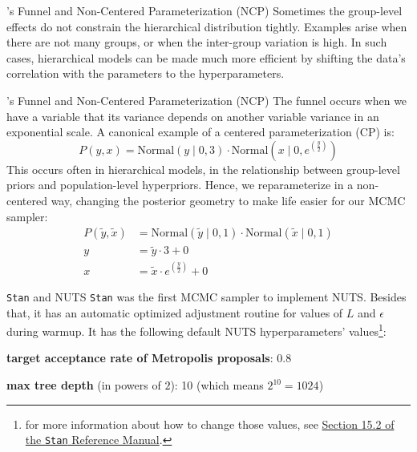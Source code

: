 \begin{frame}{\textcite{nealSliceSampling2003}'s Funnel and Non-Centered Parameterization (NCP)}
	Sometimes the group-level effects do not constrain the hierarchical distribution tightly.
	\vfill
	Examples arise when there are not many groups,
	or when the inter-group variation is high.
	\vfill
	In such cases, hierarchical models can be made much more efficient by shifting the
	data's correlation with the parameters to the hyperparameters.
\end{frame}

\begin{frame}{\textcite{nealSliceSampling2003}'s Funnel and Non-Centered Parameterization (NCP)}
	\small
	The funnel occurs when we have a variable that its variance depends on another variable variance
	in an exponential scale.
	A canonical example of a centered parameterization (CP) is:
	$$
		P(y,x) = \text{Normal}(y \mid 0 ,3) \cdot
		\text{Normal}\left(x \mid 0, e^{\left(\frac{y}{2}\right)}\right)
	$$
	This occurs often in hierarchical models,
	in the relationship between group-level priors and population-level hyperpriors.
	Hence, we reparameterize in a non-centered way,
	changing the posterior geometry to make life easier for our MCMC sampler:
	$$
		\begin{aligned}
			P(\tilde{y},\tilde{x}) & = \text{Normal}(\tilde{y} \mid 0, 1) \cdot
			\text{Normal}(\tilde{x} \mid 0, 1)                                           \\
			y                      & = \tilde{y} \cdot 3 + 0                             \\
			x                      & = \tilde{x} \cdot  e^{\left(\frac{y}{2}\right)} + 0
		\end{aligned}
	$$
\end{frame}

\begin{frame}{\texttt{Stan} and NUTS}
	\texttt{Stan} was the first MCMC sampler to implement NUTS.
	Besides that, it has an automatic optimized adjustment routine for values of $L$ and $\epsilon$ during warmup.
	It has the following default NUTS hyperparameters' values\footnote{
		for more information about how to change those values, see \href{
			https://mc-stan.org/docs/reference-manual/hmc-algorithm-parameters.html}{
			Section 15.2 of the \texttt{Stan} Reference Manual}.}:
	\begin{vfilleditems}
		\item \textbf{target acceptance rate of Metropolis proposals}: 0.8
		\item \textbf{max tree depth} (in powers of $2$): 10 (which means $2^{10} = 1024$)
	\end{vfilleditems}
\end{frame}

